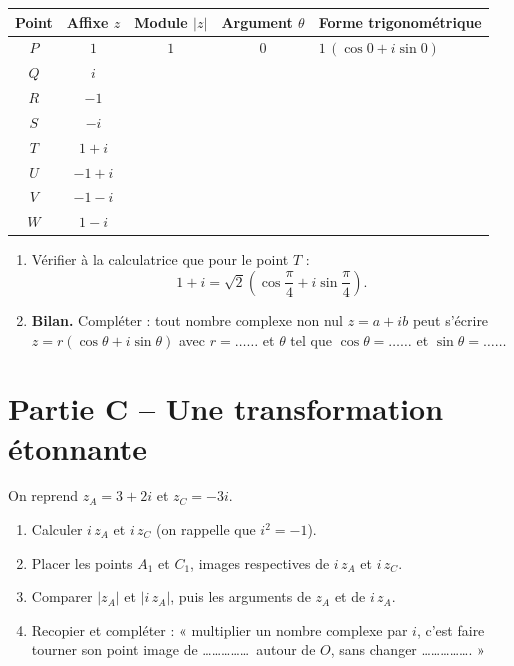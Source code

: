 \documentclass[11pt,a4paper]{article}
\begin{document}
\begin{center}
\small
\renewcommand{\arraystretch}{1.55}
\begin{tabular}{|c|c|c|c|>{\centering\arraybackslash}p{5.3cm}|}
\hline
\textbf{Point} & \textbf{Affixe } $z$ & \textbf{Module } $|z|$ & \textbf{Argument } $\theta$
& \textbf{Forme trigonométrique}\\
\hline
$P$ & $1$   & $1$ & $0$        & $1\,(\cos 0 + i\sin 0)$\\
\hline
$Q$ & $i$   &     &            & \\
\hline
$R$ & $-1$  &     &            & \\
\hline
$S$ & $-i$  &     &            & \\
\hline
$T$ & $1+i$ &     &            & \\
\hline
$U$ & $-1+i$&     &            & \\
\hline
$V$ & $-1-i$&     &            & \\
\hline
$W$ & $1-i$ &     &            & \\
\hline
\end{tabular}
\end{center}

\begin{enumerate}[label=\textbf{\arabic*.},start=5]
  \item Vérifier à la calculatrice que pour le point $T$ :
        \[ 1+i = \sqrt{2}\left(\cos\frac{\pi}{4} + i\sin\frac{\pi}{4}\right). \]
  \item \textbf{Bilan.} Compléter : tout nombre complexe non nul $z = a+ib$ peut s'écrire
        $z = r(\cos\theta + i\sin\theta)$ avec $r = \dots\dots$ et $\theta$ tel que
        $\cos\theta = \dots\dots$ et $\sin\theta = \dots\dots$
\end{enumerate}

\section*{Partie C -- Une transformation étonnante}

On reprend $z_A = 3+2i$ et $z_C = -3i$.

\begin{enumerate}[label=\textbf{\arabic*.}]
  \item Calculer $i\,z_A$ et $i\,z_C$ (on rappelle que $i^2=-1$).
  \item Placer les points $A_1$ et $C_1$, images respectives de $i\,z_A$ et $i\,z_C$.
  \item Comparer $|z_A|$ et $|i\,z_A|$, puis les arguments de $z_A$ et de $i\,z_A$.
  \item Recopier et compléter : « multiplier un nombre complexe par $i$, c'est faire tourner
        son point image de \dots\dots\dots\dots\dots\ autour de $O$, sans changer \dots\dots\dots\dots\dots. »
\end{enumerate}
\end{document}
